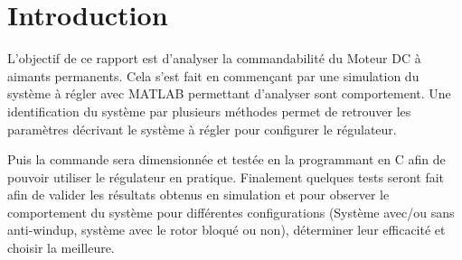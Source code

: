 \section{Introduction}
L'objectif de ce rapport est d'analyser la commandabilité du Moteur DC à aimants permanents. Cela s'est fait en commençant par une simulation du système à régler avec MATLAB permettant d'analyser sont comportement. Une identification du système par plusieurs méthodes permet de retrouver les paramètres décrivant le système à régler pour configurer le régulateur. \bigskip 


\par Puis la commande sera dimensionnée et testée en la programmant en C afin de pouvoir utiliser le régulateur en pratique. Finalement quelques tests seront fait afin de valider les résultats obtenus en simulation et pour observer le comportement du système pour différentes configurations (Système avec/ou sans anti-windup, système avec le rotor bloqué ou non), déterminer leur efficacité et choisir la meilleure.

